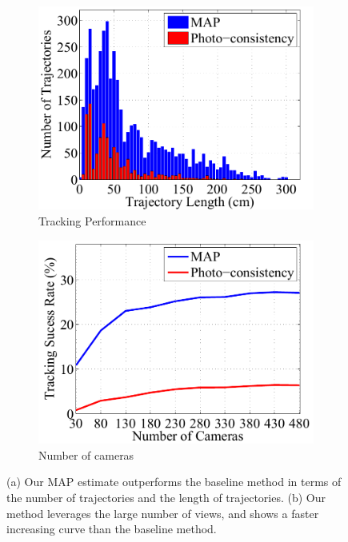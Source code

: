 \begin{figure}[t]
	\centering       
	\begin{subfigure}{0.45\textwidth}
		\includegraphics[width=\textwidth]{figures/Circular_Cam480_pt_length3}
		\caption{Tracking Performance}
		\label{Fig:traj_distance_histo}
	\end{subfigure}
	\begin{subfigure}{0.45\textwidth}
		\includegraphics[width=\textwidth]{figures/Circular_PtNum_CamNum3}
		\caption{Number of cameras}
		\label{Fig:survivedPt}
	\end{subfigure}
	\caption{(a) Our MAP estimate outperforms the baseline method in terms of the number of trajectories and the length of trajectories. (b) Our method leverages the large number of views, and shows a faster increasing curve than the baseline method.} 
	\label{Fig:quantitative}
\end{figure}

